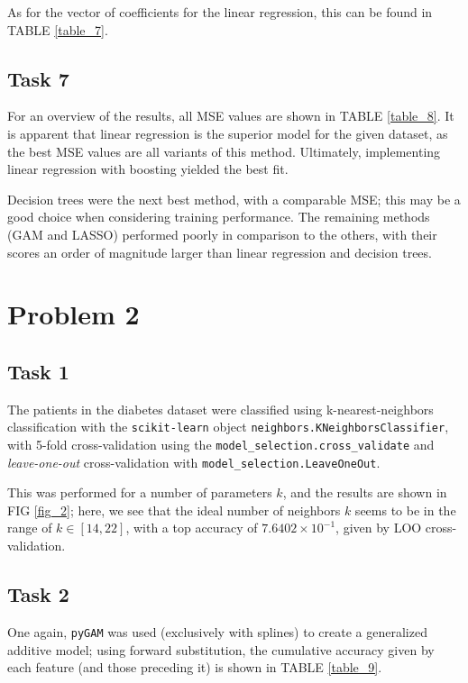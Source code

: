 \documentclass[twoside,twocolumn,10pt]{revtex4-1}
\begin{document}
	As for the vector of coefficients for the linear regression, this can be found in TABLE \ref{table_7}.
	 
	\subsection*{Task 7}
	
	For an overview of the results, all MSE values are shown in TABLE \ref{table_8}.  It is apparent that linear regression is the superior model for the given dataset, as the best MSE values are all variants of this method.  Ultimately, implementing linear regression with boosting yielded the best fit.  
	
	Decision trees were the next best method, with a comparable MSE; this may be a good choice when considering training performance.  The remaining methods (GAM and LASSO) performed poorly in comparison to the others, with their scores an order of magnitude larger than linear regression and decision trees.

	\section{Problem 2}
	
	\subsection*{Task 1}
	
	The patients in the diabetes dataset were classified using k-nearest-neighbors classification with the \texttt{scikit-learn} object \texttt{neighbors.KNeighborsClassifier}, with 5-fold cross-validation using the \texttt{model\_selection.cross\_validate} and \textit{leave-one-out} cross-validation with \texttt{model\_selection.LeaveOneOut}.  
	
	This was performed for a number of parameters $k$, and the results are shown in FIG \ref{fig_2}; here, we see that the ideal number of neighbors $k$ seems to be in the range of $k \in [14,22]$, with a top accuracy of $7.6402 \times 10^{-1}$, given by LOO cross-validation.
	
	\subsection*{Task 2}
	
	One again, \texttt{pyGAM} was used (exclusively with splines) to create a generalized additive model; using forward substitution, the cumulative accuracy given by each feature (and those preceding it) is shown in TABLE \ref{table_9}.  
	
\end{document}
